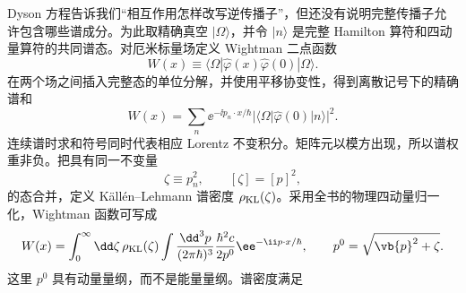 Dyson 方程告诉我们“相互作用怎样改写逆传播子”，但还没有说明完整传播子允许包含哪些谱成分。为此取精确真空 $|\Omega\rangle$，并令 $|n\rangle$ 是完整 Hamilton 算符和四动量算符的共同谱态。对厄米标量场定义 Wightman 二点函数
\begin{equation*}
 W(x)\equiv\langle\Omega|\hat\varphi(x)\hat\varphi(0)|\Omega\rangle.
\end{equation*}
在两个场之间插入完整态的单位分解，并使用平移协变性，得到离散记号下的精确谱和
\begin{equation}
 {
 W(x)
 =\sum_n \ee^{-\ii p_n\cdot x/\hbar}
 |\langle\Omega|\hat\varphi(0)|n\rangle|^2.}
 \label{eq:W-spectral-sum-SI-r12}
\end{equation}
连续谱时求和符号同时代表相应 Lorentz 不变积分。矩阵元以模方出现，所以谱权重非负。把具有同一不变量
\begin{equation*}
 \zeta\equiv p_n^2,\qquad [\zeta]=[p]^2,
\end{equation*}
的态合并，定义 Källén--Lehmann 谱密度 $\rho_{\rm KL}(\zeta)$。采用全书的物理四动量归一化，Wightman 函数可写成
\begin{equation}
 {
 W(x)=\int_0^\infty\dd\zeta\,\rho_{\rm KL}(\zeta)
 \int\frac{\dd^3 p}{(2\pi\hbar)^3}\frac{\hbar^2 c}{2p^0}
 \ee^{-\ii p\cdot x/\hbar},
 \qquad p^0=\sqrt{\vb{p}^2+\zeta}.}
 \label{eq:KL-Wightman-mass-shell-r15}
\end{equation}
这里 $p^0$ 具有动量量纲，而不是能量量纲。谱密度满足


